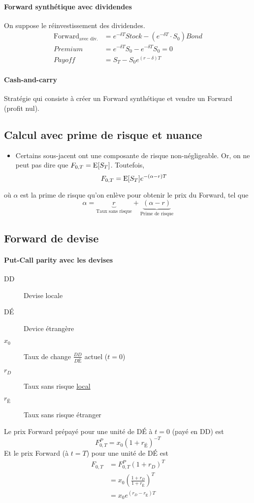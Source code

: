 \documentclass[10pt, french]{article}
\begin{document}
\begin{multicols*}{2}
\paragraph{Forward synthétique avec dividendes}
On suppose le réinvestissement des dividendes.
\begin{align*}
\text{Forward}_{\text{avec div.}} & = e^{-\delta T} Stock - (e^{-\delta T} \cdot S_0) Bond \\
Premium		& =  e^{-\delta T} S_0 - e^{-\delta T} S_0 = 0 \\
Payoff			& = S_T - S_0 e^{(r-\delta) T}
\end{align*}

\paragraph{Cash-and-carry}
Stratégie qui consiste  à créer un Forward synthétique et vendre un Forward (profit nul).


\subsection*{Calcul avec prime de risque et nuance}
\begin{itemize}
\item Certains sous-jacent ont une composante de risque non-négligeable. Or, on ne peut pas dire que $F_{0,T} = \mathrm{E} {\left[ S_T \right]}$. Toutefois,
\[F_{0,T} = \mathrm{E} {\left[ S_T \right]} e^{-(\alpha - r) T}\]
\end{itemize}
où $\alpha$ est la prime de risque 	qu'on enlève pour obtenir le prix du Forward, tel que
\[\alpha = \underbrace{r}_{\text{Taux sans risque}} + \underbrace{(\alpha - r)}_{\text{Prime de risque}}\]

\subsection*{Forward de devise}
\paragraph{Put-Call parity avec les devises}
\begin{description}
\item[DD] Devise locale
\item[DÉ] Device étrangère
\item[$x_0$] Taux de change $\frac{DD}{DÉ}$ actuel ($t=0$)
\item[$r_D$] Taux sans risque \underline{local}
\item[$r_{É}$] Taux sans risque étranger
\end{description}
Le prix Forward prépayé pour une unité de DÉ à $t =0$ (payé en DD) est
\[F_{0,T}^{P}  = x_0 (1 + r_{É})^{-T} \]
Et le prix Forward (à $t = T$) pour une unité de DÉ est
\begin{align*}
F_{0,T} & = F_{0,T}^{P}(1+r_D)^{T} \\
& = x_0 \left(  \frac{1+r_D}{1+r_{É}}   \right)^{T}\\
&  = x_0 e^{(r_D - r_{É})T}
\end{align*}


\end{multicols*}
\end{document}
